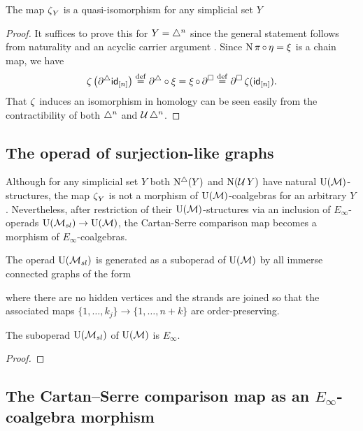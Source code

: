 \begin{lemma}
	The map $\operatorname{\zeta}_Y$ is a quasi-isomorphism for any simplicial set $Y$
\end{lemma}

\begin{proof}
	It suffices to prove this for $Y = \triangle^n$ since the general statement follows from naturality and an acyclic carrier argument \cite{eilenberg1953acyclic}.
	Since $\operatorname{N} \operatorname{\pi} \circ \operatorname{\eta} = \operatorname{\xi}$ is a chain map, we have
	\begin{align*}
	\operatorname{\zeta} \big( \partial^\triangle \mathsf{id}_{[n]} \big) \stackrel{\mathrm{def}}{=}
	\partial^\triangle \circ \operatorname{\xi} =
	\operatorname{\xi} \circ \, \partial^\square \stackrel{\mathrm{def}}{=}
	\partial^\square \operatorname{\zeta} (\mathsf{id}_{[n]}).
	\end{align*}
	That $\operatorname{\zeta}$ induces an isomorphism in homology can be seen easily from the contractibility of both $\triangle^n$ and $\operatorname{\mathcal{U}} \triangle^n$.
\end{proof}

\subsection{The operad of surjection-like graphs} \label{ss:surjection-like graphs}

Although for any simplicial set $Y$ both $\operatorname{N^{\triangle}}(Y)$ and $\operatorname{N}(\operatorname{\mathcal{U}} Y)$ have natural ${\operatorname{U}(\mathcal{M})}$-structures, the map $\operatorname{\zeta}_Y$ is not a morphism of ${\operatorname{U}(\mathcal{M})}$-coalgebras for an arbitrary $Y$.
Nevertheless, after restriction of their ${\operatorname{U}(\mathcal{M})}$-structures via an inclusion of $E_\infty$-operads ${\operatorname{U}(\mathcal{M}_{sl})} \to {\operatorname{U}(\mathcal{M})}$, the Cartan-Serre comparison map becomes a morphism of $E_\infty$-coalgebras.

The operad ${\operatorname{U}(\mathcal{M}_{sl})}$ is generated as a suboperad of ${\operatorname{U}(\mathcal{M})}$ by all immerse connected graphs of the form

where there are no hidden vertices and the strands are joined so that the associated maps $\{1, \dots, k_j\} \to \{1, \dots, n+k\}$ are order-preserving.

\begin{proposition} \label{p:simplicialandcubical}
	The suboperad ${\operatorname{U}(\mathcal{M}_{sl})}$ of ${\operatorname{U}(\mathcal{M})}$ is $E_\infty$.
\end{proposition}

\begin{proof}
\end{proof}

\subsection{The Cartan--Serre comparison map as an $E_\infty$-coalgebra morphism} \label{ss:the cartan-serre chain map}

